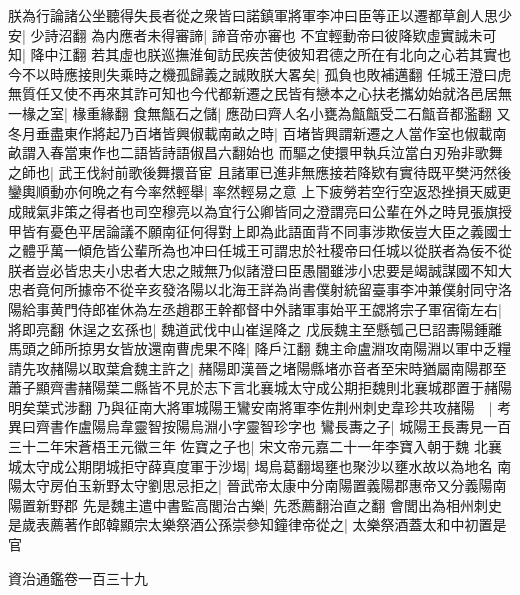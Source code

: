 朕為行論諸公坐聽得失長者從之衆皆曰諾鎮軍將軍李冲曰臣等正以遷都草創人思少安|{
	少詩沼翻}
為内應者未得審諦|{
	諦音帝亦審也}
不宜輕動帝曰彼降欵虛實誠未可知|{
	降中江翻}
若其虛也朕巡撫淮甸訪民疾苦使彼知君德之所在有北向之心若其實也今不以時應接則失乘時之機孤歸義之誠敗朕大畧矣|{
	孤負也敗補邁翻}
任城王澄曰虎無質任又使不再來其詐可知也今代都新遷之民皆有戀本之心扶老攜幼始就洛邑居無一椽之室|{
	椽重緣翻}
食無甔石之儲|{
	應劭曰齊人名小甕為甔甔受二石甔音都濫翻}
又冬月垂盡東作將起乃百堵皆興俶載南畝之時|{
	百堵皆興謂新遷之人當作室也俶載南畝謂入春當東作也二語皆詩語俶昌六翻始也}
而驅之使擐甲執兵泣當白刃殆非歌舞之師也|{
	武王伐紂前歌後舞擐音宦}
且諸軍已進非無應接若降欵有實待既平樊沔然後鑾輿順動亦何晩之有今率然輕舉|{
	率然輕易之意}
上下疲勞若空行空返恐挫損天威更成賊氣非策之得者也司空穆亮以為宜行公卿皆同之澄謂亮曰公輩在外之時見張旗授甲皆有憂色平居論議不願南征何得對上即為此語面背不同事涉欺佞豈大臣之義國士之體乎萬一傾危皆公輩所為也冲曰任城王可謂忠於社稷帝曰任城以從朕者為佞不從朕者豈必皆忠夫小忠者大忠之賊無乃似諸澄曰臣愚闇雖涉小忠要是竭誠謀國不知大忠者竟何所據帝不從辛亥發洛陽以北海王詳為尚書僕射統留臺事李冲兼僕射同守洛陽給事黄門侍郎崔休為左丞趙郡王幹都督中外諸軍事始平王勰將宗子軍宿衛左右|{
	將即亮翻}
休逞之玄孫也|{
	魏道武伐中山崔逞降之}
戊辰魏主至懸瓠己巳詔夀陽鍾離馬頭之師所掠男女皆放還南曹虎果不降|{
	降戶江翻}
魏主命盧淵攻南陽淵以軍中乏糧請先攻赭陽以取葉倉魏主許之|{
	赭陽即漢晉之堵陽縣堵亦音者至宋時猶屬南陽郡至蕭子顯齊書赭陽葉二縣皆不見於志下言北襄城太守成公期拒魏則北襄城郡置于赭陽明矣葉式涉翻}
乃與征南大將軍城陽王鸞安南將軍李佐荆州刺史韋珍共攻赭陽　|{
	考異曰齊書作盧陽烏韋靈智按陽烏淵小字靈智珍字也}
鸞長夀之子|{
	城陽王長夀見一百三十二年宋蒼梧王元徽三年}
佐寶之子也|{
	宋文帝元嘉二十一年李寶入朝于魏}
北襄城太守成公期閉城拒守薛真度軍于沙堨|{
	堨烏葛翻堨壅也聚沙以壅水故以為地名}
南陽太守房伯玉新野太守劉思忌拒之|{
	晉武帝太康中分南陽置義陽郡惠帝又分義陽南陽置新野郡}
先是魏主遣中書監高閭治古樂|{
	先悉薦翻治直之翻}
會閭出為相州刺史是歲表薦著作郎韓顯宗太樂祭酒公孫崇參知鐘律帝從之|{
	太樂祭酒蓋太和中初置是官}


資治通鑑卷一百三十九
